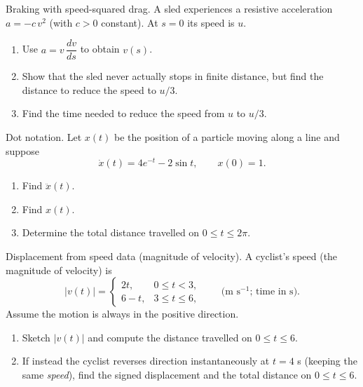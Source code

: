 \documentclass[11pt]{article}
\def\textbf#1{#1}%
\newcounter{question}
\begin{document}
\begin{question}
\textbf{Braking with speed-squared drag.}
A sled experiences a resistive acceleration \(a=-c\,v^{2}\) (with \(c>0\) constant). 
At \(s=0\) its speed is \(u\).
\begin{enumerate}
  \item Use \(a=v\,\dfrac{dv}{ds}\) to obtain $v(s)$.
  \item Show that the sled never actually stops in finite distance, but find the distance to reduce the speed to \(u/3\).
  \item Find the time needed to reduce the speed from \(u\) to \(u/3\).
\end{enumerate}
\end{question}

\begin{question}
\textbf{Dot notation.}
Let \(x(t)\) be the position of a particle moving along a line and suppose
\[
\dot{x}(t)=4e^{-t}-2\sin t,\qquad x(0)=1.
\]
\begin{enumerate}
  \item Find \(\ddot{x}(t)\).
  \item Find \(x(t)\).
  \item Determine the total distance travelled on \(0\le t\le 2\pi\).
\end{enumerate}
\end{question}

\begin{question}
\textbf{Displacement from speed data (magnitude of velocity).}
A cyclist’s speed (the magnitude of velocity) is
\[
|v(t)|=\begin{cases}
2t, & 0\le t<3,\\[4pt]
6- t, & 3\le t\le 6,
\end{cases}
\qquad\text{(m s$^{-1}$; time in s).}
\]
Assume the motion is always in the positive direction.
\begin{enumerate}
  \item Sketch $|v(t)|$ and compute the distance travelled on $0\le t\le 6$.
  \item If instead the cyclist reverses direction instantaneously at $t=4$ s (keeping the same \emph{speed}), find the signed displacement and the total distance on $0\le t\le 6$.
\end{enumerate}
\end{question}
\end{document}
